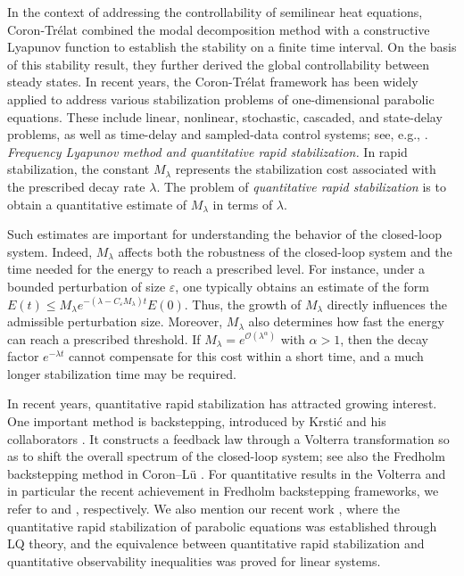 \documentclass[a4paper]{article}
\numberwithin{equation}{section}
\begin{document}
In the context of addressing the controllability of semilinear heat equations, Coron-Tr\'{e}lat \cite{CT1} combined the modal decomposition method with a constructive Lyapunov function to establish the stability on a finite time interval. On the basis of this stability result, they further derived the global controllability between steady states. In recent years, the Coron-Tr\'{e}lat framework has been widely applied to address various stabilization problems of one-dimensional parabolic equations. These include linear, nonlinear, stochastic, cascaded, and state-delay problems, as well as time-delay and sampled-data control systems; see, e.g., \cite{KF,KF2,LP1,LP4,LS,PWF,PT,SWZ}.\\[-2mm]
 
\noindent \textit{Frequency Lyapunov method and quantitative rapid stabilization.} In rapid stabilization, the constant $M_\lambda$ represents the stabilization cost associated with the prescribed decay rate $\lambda$. The problem of \textit{quantitative rapid stabilization} is to obtain a quantitative estimate of $M_\lambda$ in terms of $\lambda$.

Such estimates are important for understanding the behavior of the closed-loop system. Indeed, $M_\lambda$ affects both the robustness of the closed-loop system and the time needed for the energy to reach a prescribed level. For instance, under a bounded perturbation of size $\varepsilon$, one typically obtains an estimate of the form $E(t)\leq M_\lambda e^{-(\lambda-C_\varepsilon M_\lambda)t}E(0)$. Thus, the growth of $M_\lambda$ directly influences the admissible perturbation size. Moreover, $M_\lambda$ also determines how fast the energy can reach a prescribed threshold. If $M_\lambda=e^{\mathcal O(\lambda^\alpha)}$ with $\alpha>1$, then the decay factor $e^{-\lambda t}$ cannot compensate for this cost within a short time, and a much longer stabilization time may be required.
\vspace{1mm}

In recent years, quantitative rapid stabilization has attracted growing interest. One important method is backstepping, introduced by Krsti\'c and his collaborators \cite{BK,KS}. It constructs a feedback law through a Volterra transformation so as to shift the overall spectrum of the closed-loop system; see also the Fredholm backstepping method in Coron--L\"u \cite{CL1}. For quantitative results in the Volterra and in particular the recent achievement in Fredholm backstepping frameworks, we refer to \cite{CN} and \cite{GHMXZ}, respectively. We also mention our recent work \cite{XXZ}, where the quantitative rapid stabilization of parabolic equations was established through LQ theory, and the equivalence between quantitative rapid stabilization and quantitative observability inequalities was proved for linear systems.
\end{document}
